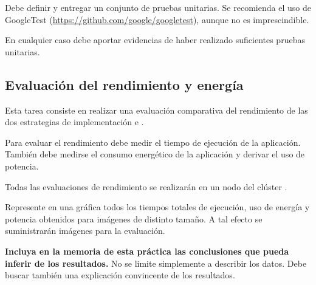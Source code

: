 Debe definir y entregar un conjunto de pruebas unitarias.
Se recomienda el uso de GoogleTest (\url{https://github.com/google/googletest}),
aunque no es imprescindible.

En cualquier caso debe aportar evidencias de haber realizado suficientes
pruebas unitarias.


\subsection{Evaluación del rendimiento y energía}

Esta tarea consiste en realizar una evaluación comparativa del rendimiento
de las dos estrategias de implementación  e .

Para evaluar el rendimiento debe medir el tiempo de ejecución de la
aplicación. También debe medirse el consumo energético de la aplicación
y derivar el uso de potencia.

Todas las evaluaciones de rendimiento se realizarán en un nodo del
clúster .

Represente en una gráfica todos los tiempos totales de ejecución, uso de energía y potencia
obtenidos para imágenes de distinto tamaño. A tal efecto
se suministrarán imágenes para la evaluación.

\textbf{Incluya en la memoria de esta práctica las conclusiones que pueda inferir de los resultados.}
No se limite simplemente a describir los datos. Debe buscar también una
explicación convincente de los resultados.

